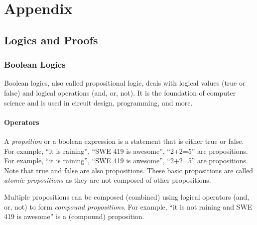 \documentclass[oneside,11pt,dvipsnames]{book}
\begin{document}
\part{Appendix}
\appendix

\chapter{Logics and Proofs}

\section{Boolean Logics}

Boolean logics, also called propositional logic, deals with logical values (true or false) and logical operations (and, or, not). It is the foundation of computer science and is used in circuit design, programming, and more. 

\subsection{Operators}

A \emph{propsition} or a boolean expression is a statement that is either true or false. For example, ``it is raining'', ``SWE 419 is awesome'', ``2+2=5'' are propositions. For example, ``it is raining'', ``SWE 419 is awesome'', ``2+2=5'' are propositions. Note that true and false are also propositions.  These basic propositions are called \emph{atomic propositions} as they are not composed of other propositions.

Multiple propositions can be composed (combined) using logical operators (and, or, not) to form \emph{compound propositions}. For example, ``it is not raining and SWE 419 is awesome'' is a (compound) proposition. 
\end{document}
